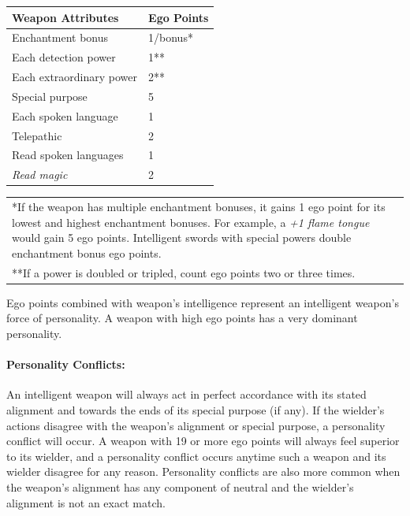 \begin{multicols}{2}
\begin{minipage}{\columnwidth}
\label{weaponego}
\noindent \begin{tabular}{|p{}|p{}|}
\hline
Weapon Attributes	& Ego Points \\
\hline\hline
\rowcolor[gray]{0.9}Enchantment bonus	& 1/bonus* \\
Each detection power	& 1** \\
\rowcolor[gray]{0.9}Each extraordinary power	& 2** \\
Special purpose	& 5 \\
\rowcolor[gray]{0.9}Each spoken language	& 1 \\
Telepathic 	& 2 \\
\rowcolor[gray]{0.9}Read spoken languages	& 1 \\
\textit{Read magic}	& 2 \\
\hline
\end{tabular}
\noindent\begin{tabular}{p{}}
*If the weapon has multiple enchantment bonuses, it gains 1 ego point for its lowest and highest enchantment bonuses.  For example, a \textit{+1 flame tongue} would gain 5 ego points.  Intelligent swords with special powers double enchantment bonus ego points. \\
**If a power is doubled or tripled, count ego points two or three times. \\
\end{tabular}\vspace{.5em}

\end{minipage}

Ego points combined with weapon's intelligence represent an intelligent weapon's force of personality.  A weapon with high ego points has a very dominant personality.  

\paragraph{Personality Conflicts:} An intelligent weapon will always act in perfect accordance with its stated alignment and towards the ends of its special purpose (if any).  If the wielder's actions disagree with the weapon's alignment or special purpose, a personality conflict will occur.  A weapon with 19 or more ego points will always feel superior to its wielder, and a personality conflict occurs anytime such a weapon and its wielder disagree for any reason.  Personality conflicts are also more common when the weapon's alignment has any component of neutral and the wielder's alignment is not an exact match.


\end{multicols}
